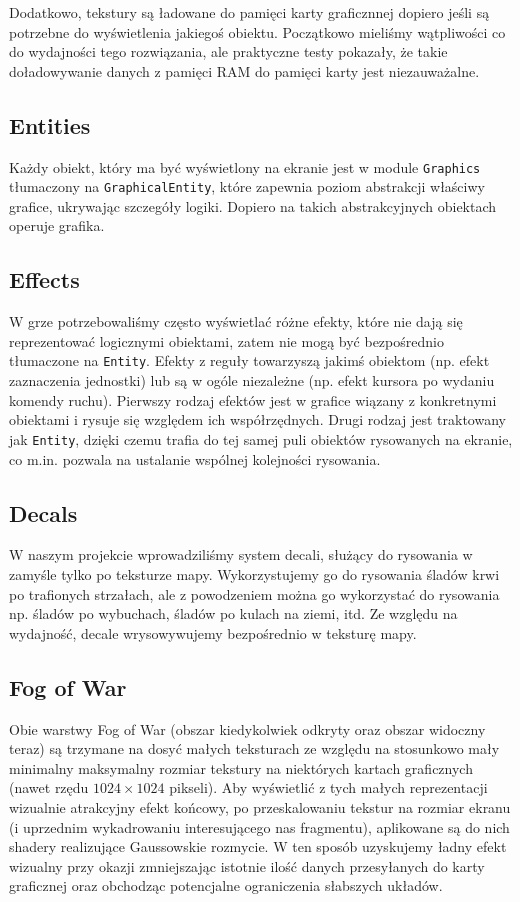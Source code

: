 \documentclass[licencjacka]{pracamgr}
\begin{document}
      Dodatkowo, tekstury są ładowane do pamięci karty graficznnej dopiero jeśli są potrzebne do wyświetlenia jakiegoś
      obiektu. Początkowo mieliśmy wątpliwości co do wydajności tego rozwiązania, ale praktyczne testy pokazały, że
      takie doładowywanie danych z pamięci RAM do pamięci karty jest niezauważalne.

    \subsection{Entities}
      Każdy obiekt, który ma być wyświetlony na ekranie jest w module \texttt{Graphics} tłumaczony na \texttt{GraphicalEntity}, które
      zapewnia poziom abstrakcji właściwy grafice, ukrywając szczegóły logiki. Dopiero na takich abstrakcyjnych
      obiektach operuje grafika.

    \subsection{Effects}
      W grze potrzebowaliśmy często wyświetlać różne efekty, które nie dają się reprezentować logicznymi obiektami,
      zatem nie mogą być bezpośrednio tłumaczone na \texttt{Entity}. Efekty z reguły towarzyszą jakimś obiektom (np. efekt
      zaznaczenia jednostki) lub są w ogóle niezależne (np. efekt kursora po wydaniu komendy ruchu). Pierwszy rodzaj
      efektów jest w grafice wiązany z konkretnymi obiektami i rysuje się względem ich współrzędnych. Drugi rodzaj jest
      traktowany jak \texttt{Entity}, dzięki czemu trafia do tej samej puli obiektów rysowanych na ekranie, co m.in. pozwala na
      ustalanie wspólnej kolejności rysowania.

    \subsection{Decals}
      W naszym projekcie wprowadziliśmy system decali, służący do rysowania w zamyśle tylko po teksturze mapy.
      Wykorzystujemy go do rysowania śladów krwi po trafionych strzałach, ale z powodzeniem można go wykorzystać do
      rysowania np. śladów po wybuchach, śladów po kulach na ziemi, itd. Ze względu na wydajność, decale wrysowywujemy
      bezpośrednio w teksturę mapy.

    \subsection{Fog of War}
      Obie warstwy Fog of War (obszar kiedykolwiek odkryty oraz obszar widoczny teraz) są trzymane na dosyć małych
      teksturach ze względu na stosunkowo mały minimalny maksymalny rozmiar tekstury na niektórych kartach graficznych
      (nawet rzędu $1024 \times 1024$ pikseli). Aby wyświetlić z tych małych reprezentacji wizualnie atrakcyjny efekt
      końcowy, po przeskalowaniu tekstur na rozmiar ekranu (i uprzednim wykadrowaniu interesującego nas fragmentu),
      aplikowane są do nich shadery realizujące Gaussowskie rozmycie\cite{GB}. W ten sposób uzyskujemy ładny efekt wizualny
      przy okazji zmniejszając istotnie ilość danych przesyłanych do karty graficznej oraz obchodząc potencjalne
      ograniczenia słabszych układów.
\end{document}
